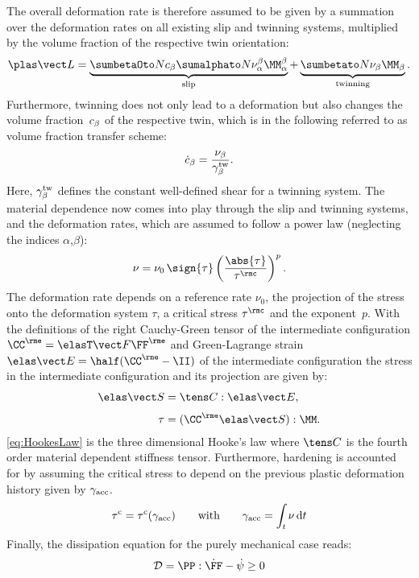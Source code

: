 The overall deformation rate is therefore assumed to be given by a summation over the deformation rates on all existing slip and twinning systems, multiplied by the volume fraction of the respective twin orientation\supercite{kalidindi1998incorporation}:  
\begin{equation}
  \LLp = \underbrace{\sumbO \cb \sumaI \nuab \MMab}_{\text{slip}} + \underbrace{\sumbI \nub \MMb}_{\text{twinning}}.
\end{equation}
Furthermore, twinning does not only lead to a deformation but also changes the volume fraction~$c_{\beta}$ of the respective twin, which is in the following referred to as volume fraction transfer scheme:
\begin{align}
  \dot{c}_{\beta} = \frac{\nu_\beta}{\gamma^{\rm tw}_\beta}.
\end{align}
Here, $\gamma^{\rm tw}_\beta$ defines the constant well-defined shear for a twinning system. The material dependence now comes into play through the slip and twinning systems, and the deformation rates, which are assumed to follow a power law (neglecting the indices $\alpha$,$\beta$):
\begin{align}
  \nu = \nu_0 \, \sign{\tau} \left( \frac{\abs{\tau}}{\tau^\rmc} \right)^{p}.
  \label{eq:powerlaw}
\end{align}
The deformation rate depends on a reference rate $\nu_0$, the projection of the stress onto the deformation system $\tau$, a critical stress $\tau^\rmc$ and the exponent~$p$. With the definitions of the right Cauchy-Green tensor of the intermediate configuration $\CCe=\FFeT\FFe$ and Green-Lagrange strain $\EEe=\half(\CCe-\II)$ of the intermediate configuration the stress in the intermediate configuration and its projection are given by:
\begin{align}
  \SSe &= \CCCC:\EEe,  \label{eq:HookesLaw} \\[3pt]
  \tau &= (\CCe\SSe):\MM.
\end{align}
\cref{eq:HookesLaw} is the three dimensional Hooke's law where $\CCCC$ is the fourth order material dependent stiffness tensor. Furthermore, hardening is accounted for by assuming the critical stress to depend on the previous plastic deformation history given by $\gamma_{\rm acc}$.
\begin{align}
  \tau^{\rm c} = \tau^{\rm c}(\gamma_{\rm acc}) \qquad \text{with} \qquad \gamma_{\rm acc} = \int_t \nu \, {\rm d} t
\end{align}
Finally, the dissipation equation for the purely mechanical case reads:
\begin{align} 
  \mathcal{D} = \PP:\dot\FF - \dot\psi \geq 0
\end{align}
